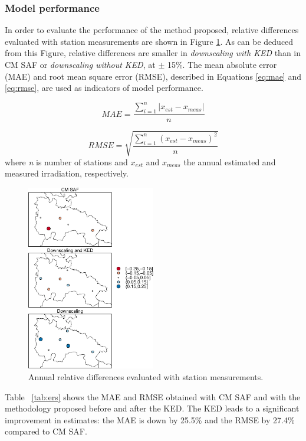 \documentclass[11pt, english]{article}
\begin{document}
\subsubsection{Model performance}
\label{sec:error}

In order to evaluate the performance of the method proposed, relative
differences evaluated with station measurements are shown in
Figure \ref{fig:spplot}. As can be deduced from this Figure, relative
differences are smaller in \emph{downscaling with KED} than in CM SAF
or \emph{downscaling without KED}, at $\pm$ 15\%.  The mean absolute
error (MAE) and root mean square error (RMSE), described in Equations
\ref{eq:mae} and \ref{eq:rmse}, are used as indicators of model
performance.


\begin{equation}
\label{eq:mae}
MAE=\frac{\sum_{i=1}^n{\left |{x_{est}-x_{meas}}\right |}}{n} 
\end{equation}

\begin{equation}
\label{eq:rmse}
RMSE=\sqrt{\frac{\sum_{i=1}^n{(x_{est}-x_{meas})^2}}{n}}
\end{equation}
where \emph{n} is number of stations and $x_{est}$ and $x_{meas}$ the
annual estimated and measured irradiation, respectively.

\begin{figure}[H]
  \centering
  \includegraphics[width=0.5\textwidth]{spplot}
  \caption{Annual relative differences evaluated with station measurements.}
  \label{fig:spplot}
\end{figure}

Table ~\ref{tab:ers} shows the MAE and RMSE obtained with CM SAF and
with the methodology proposed before and after the KED. The KED leads
to a significant improvement in estimates: the MAE is down by 25.5\%
and the RMSE by 27.4\% compared to CM SAF.
\end{document}
